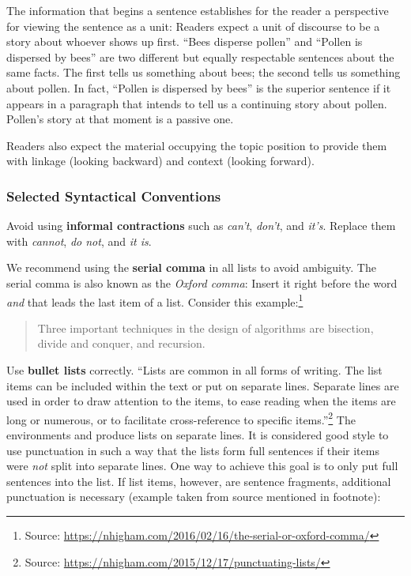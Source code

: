 The information that begins a sentence establishes for the reader a perspective for viewing the sentence as a unit: Readers expect a unit of discourse to be a story about whoever shows up first. “Bees disperse pollen” and “Pollen is dispersed by bees” are two different but equally respectable sentences about the same facts. The first tells us something about bees; the second tells us something about pollen. In fact, “Pollen is dispersed by bees” is the superior sentence if it appears in a paragraph that intends to tell us a continuing story about pollen. Pollen’s story at that moment is a passive one.

Readers also expect the material occupying the topic position to provide them with linkage (looking backward) and context (looking forward).

\subsubsection{Selected Syntactical Conventions}

Avoid using \textbf{informal contractions} such as \emph{can't}, \emph{don't}, and \emph{it's}. Replace them with \emph{cannot}, \emph{do not}, and \emph{it is}.

We recommend using the \textbf{serial comma} in all lists to avoid ambiguity. The serial comma is also known as the \emph{Oxford comma}: Insert  it right before the word \emph{and} that leads the last item of a list. Consider this example:\footnote{Source: \url{https://nhigham.com/2016/02/16/the-serial-or-oxford-comma/}}
\begin{quote}
  Three important techniques in the design of algorithms are bisection, divide and conquer, and recursion.
\end{quote}

Use \textbf{bullet lists} correctly. ``Lists are common in all forms of writing. The list items can be included within the text or put on separate lines. Separate lines are used in order to draw attention to the items, to ease reading when the items are long or numerous, or to facilitate cross-reference to specific items.''\footnote{Source: \url{https://nhigham.com/2015/12/17/punctuating-lists/}} The environments  and  produce lists on separate lines. It is considered good style to use punctuation in such a way that the lists form full sentences if their items were \emph{not} split into separate lines. One way to achieve this goal is to only put full sentences into the list. If list items, however, are sentence fragments, additional punctuation is necessary (example taken from source mentioned in footnote):

